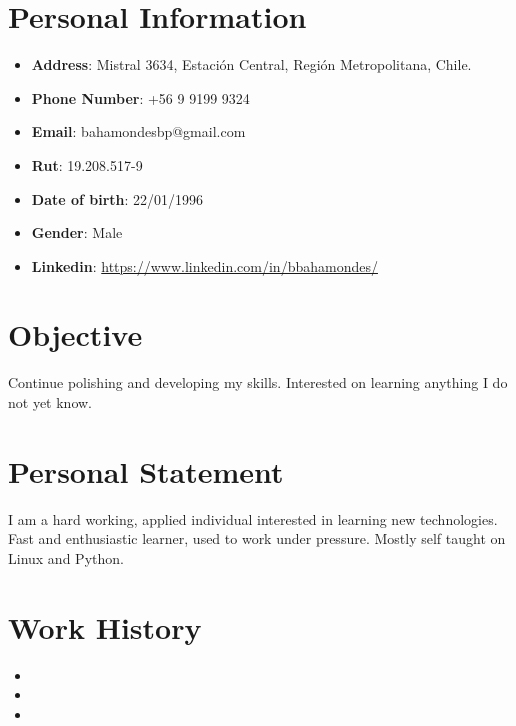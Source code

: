 \documentclass[11pt,a4paper,roman]{moderncv}        %
\begin{document}
\makecvtitle
\vspace*{-15mm}

\section{Personal Information}

\begin{itemize}
\item{\textbf{Address}: Mistral 3634, Estación Central, Región Metropolitana, Chile.}
\item{\textbf{Phone Number}: +56 9 9199 9324}
\item{\textbf{Email}: bahamondesbp@gmail.com}
\item{\textbf{Rut}: 19.208.517-9}
\item{\textbf{Date of birth}: 22/01/1996}
\item{\textbf{Gender}: Male}
\item{\textbf{Linkedin}: \url{https://www.linkedin.com/in/bbahamondes/}}
\end{itemize}

\section{Objective}
\small{ Continue polishing and developing my skills. Interested on learning anything I do not yet know.  }

\section{Personal Statement}
\small{ I am a hard working, applied individual interested in learning new technologies. Fast and enthusiastic learner, used to work under pressure. Mostly self taught on Linux and Python.}

\section{Work History}
\begin{itemize}
\item{}
\vspace{3pt}
\item{}
\vspace{3pt}
\item{}
\end{itemize}
\end{document}
